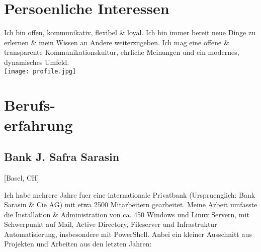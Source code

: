 \documentclass{cv}
\begin{document}
\begin{CJK*}{UTF8}{bsmi}

\maketitle%

\section{Persoenliche Interessen}
\setlength{\columnsep}{-5cm}
\begin{multicols}{2}
    Ich bin offen, kommunikativ, flexibel \& loyal. Ich bin immer bereit neue Dinge zu erlernen \& mein Wissen an Andere weiterzugeben. Ich mag eine offene \& transparente Kommunikationskultur, ehrliche Meinungen und ein modernes, dynamisches Umfeld.\\
    \texttt{[image: profile.jpg]}
\end{multicols}

\section{Berufs-\\erfahrung}

\subsection{Bank J. Safra Sarasin}[Basel, CH]
\begin{positions}
\end{positions}
Ich habe mehrere Jahre fuer eine internationale Privatbank (Urspruenglich: Bank Sarasin \& Cie AG) mit etwa 2500 Mitarbeitern gearbeitet. Meine Arbeit umfasste die Installation \& Administration von ca. 450 Windows und Linux Servern, mit Schwerpunkt auf Mail, Active Directory, Fileserver und Infrastruktur Automatisierung, insbesondere mit PowerShell. Anbei ein kleiner Ausschnitt aus Projekten und Arbeiten aus den letzten Jahren:


\end{CJK*}
\end{document}
